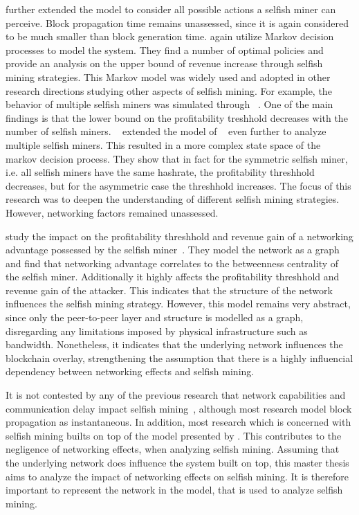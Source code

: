 \citeauthor{optimal_sm} further extended the model to consider all possible actions a selfish miner can perceive. Block propagation time remains unassessed, since it is again considered to be much smaller than block generation time.  \citeauthor{optimal_sm} again utilize Markov decision processes to model the system. They find a number of optimal policies and provide an analysis on the upper bound of revenue increase through selfish mining strategies.
This Markov model was widely used and adopted in other research directions studying other aspects of selfish mining. For example, the behavior of multiple selfish miners was simulated through \citeauthor{multi_sm}~\cite{multi_sm}. One of the main findings is that the lower bound on the profitability treshhold decreases with the number of selfish miners.
\citeauthor{deepDiveSM}~\cite{deepDiveSM} extended the model of \citeauthor{optimal_sm}~\cite{optimal_sm} even further to analyze multiple selfish miners. This resulted in a more complex state space of the markov decision process. They show that in fact for the symmetric selfish miner, i.e. all selfish miners have the same hashrate, the profitability threshhold decreases, but for the asymmetric case the threshhold increases. The focus of this research was to deepen the understanding of different selfish mining strategies. However, networking factors remained unassessed.

\citeauthor{xiao_modeling} study the impact on the profitability threshhold and revenue gain of a networking advantage possessed by the selfish miner~\cite{xiao_modeling}. They model the network as a graph and find that networking advantage correlates to the betweenness centrality of the selfish miner. Additionally it highly affects the profitability threshhold and revenue gain of the attacker. This indicates that the structure of the network influences the selfish mining strategy. However, this model remains very abstract, since only the peer-to-peer layer and structure is modelled as a graph, disregarding any limitations imposed by physical infrastructure such as bandwidth. Nonetheless, it indicates that the underlying network influences the blockchain overlay, strengthening the assumption that there is a highly influencial dependency between networking effects and selfish mining.

It is not contested by any of the previous research that network capabilities and communication delay impact selfish mining~\cite{multi_sm}, although most research model block propagation as instantaneous.
In addition, most research which is concerned with selfish mining builts on top of the model presented by \citeauthor{optimal_sm}.
This contributes to the negligence of networking effects, when analyzing selfish mining.
Assuming that the underlying network does influence the system built on top, this master thesis aims to analyze the impact of networking effects on selfish mining. It is therefore important to represent the network in the model, that is used to analyze selfish mining.

